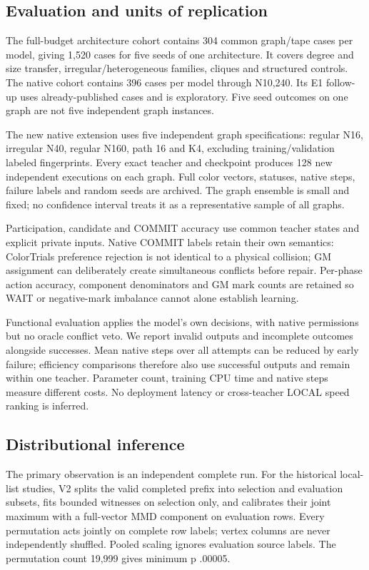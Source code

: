 \documentclass[
  11pt,
]{article}
\begin{document}
\subsection{Evaluation and units of
replication}\label{evaluation-and-units-of-replication}

The full-budget architecture cohort contains 304 common graph/tape cases
per model, giving 1,520 cases for five seeds of one architecture. It
covers degree and size transfer, irregular/heterogeneous families,
cliques and structured controls. The native cohort contains 396 cases
per model through N10,240. Its E1 follow-up uses already-published cases
and is exploratory. Five seed outcomes on one graph are not five
independent graph instances.

The new native extension uses five independent graph specifications:
regular N16, irregular N40, regular N160, path 16 and K4, excluding
training/validation labeled fingerprints. Every exact teacher and
checkpoint produces 128 new independent executions on each graph. Full
color vectors, statuses, native steps, failure labels and random seeds
are archived. The graph ensemble is small and fixed; no confidence
interval treats it as a representative sample of all graphs.

Participation, candidate and COMMIT accuracy use common teacher states
and explicit private inputs. Native COMMIT labels retain their own
semantics: ColorTrials preference rejection is not identical to a
physical collision; GM assignment can deliberately create simultaneous
conflicts before repair. Per-phase action accuracy, component
denominators and GM mark counts are retained so WAIT or negative-mark
imbalance cannot alone establish learning.

Functional evaluation applies the model's own decisions, with native
permissions but no oracle conflict veto. We report invalid outputs and
incomplete outcomes alongside successes. Mean native steps over all
attempts can be reduced by early failure; efficiency comparisons
therefore also use successful outputs and remain within one teacher.
Parameter count, training CPU time and native steps measure different
costs. No deployment latency or cross-teacher LOCAL speed ranking is
inferred.

\subsection{Distributional inference}\label{distributional-inference}

The primary observation is an independent complete run. For the
historical local-list studies, V2 splits the valid completed prefix into
selection and evaluation subsets, fits bounded witnesses on selection
only, and calibrates their joint maximum with a full-vector MMD
component on evaluation rows. Every permutation acts jointly on complete
row labels; vertex columns are never independently shuffled. Pooled
scaling ignores evaluation source labels. The permutation count 19,999
gives minimum p .00005.
\end{document}
